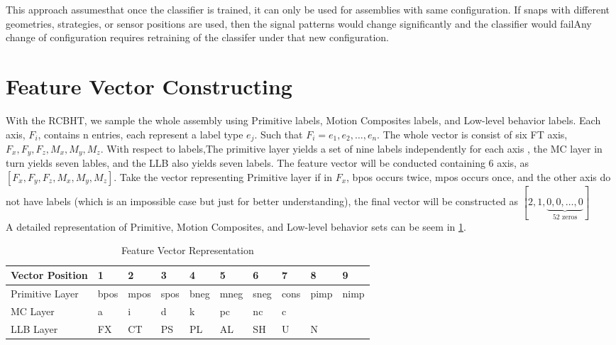 \indent This approach assumesthat once the classifier is trained, it can only be used for assemblies with same configuration. If snaps with different geometries, strategies, or sensor positions are used, then the signal patterns would change significantly and the classifier would failAny change of configuration requires retraining of the classifer under that new configuration.

\section{Feature Vector Constructing}
\indent With the RCBHT, we sample the whole assembly using Primitive labels, Motion Composites labels, and Low-level behavior labels. Each axis, $F_{i}$, contains n entries, each represent a label type $e_{j}$. Such that $F_{i} = {e_{1}, e_{2}, \dots , e_{n}}$. The whole vector is consist of six FT axis, $F_{x}, F_{y}, F_{z}, M_{x}, M_{y}, M_{z}$. With respect to labels,The primitive layer yields a set of nine labels independently for each axis , the MC layer in turn yields seven lables, and the LLB also yields seven labels. The feature vector will be conducted containing 6 axis, as $[F_{x}, F_{y}, F_{z}, M_{x}, M_{y}, M_{z}]$. Take the vector representing Primitive layer if in $F_{x}$, bpos occurs twice, mpos occurs once, and the other axis do not have labels (which is an impossible case but just for better understanding), the final vector will be constructed as $[2, 1,\underbrace{0,0, \dots, 0}_\text{52 zeros}]$     \\
\indent A detailed representation of Primitive, Motion Composites, and Low-level behavior sets can be seem in \ref{featureVector}.
\begin {table}[h]
\centering
\caption {Feature Vector Representation}
\label {featureVector}
\begin {tabular}{|llllllllll|}
\hline
Vector Position & 1     & 2     & 3     & 4     & 5     & 6     & 7     & 8     & 9     \\ \hline
Primitive Layer & bpos  & mpos  & spos  & bneg  & mneg  & sneg  & cons  & pimp  & nimp  \\ \hline
MC Layer        & a     & i     & d     & k     & pc    & nc    & c     &       &       \\ \hline
LLB Layer       & FX    & CT    & PS    & PL    & AL    & SH    & U     & N     &       \\ \hline
\end {tabular}
\end {table}

